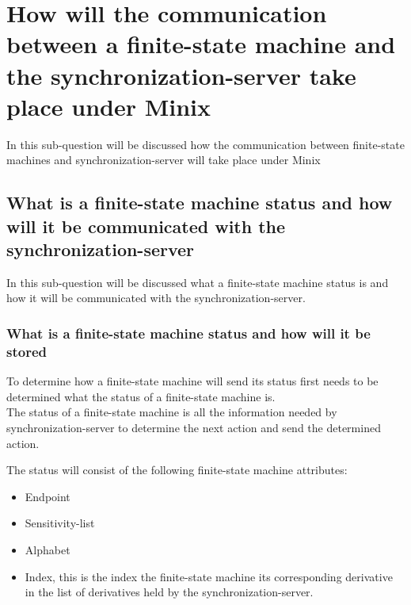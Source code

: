 \hypertarget{how-will-the-communication-between-a-finite-state-machine-and-the-synchronization-server-take-place-under-minix}{%
\section{How will the communication between a finite-state machine and
the synchronization-server take place under
Minix}\label{how-will-the-communication-between-a-finite-state-machine-and-the-synchronization-server-take-place-under-minix}}

In this sub-question will be discussed how the communication between
finite-state machines and synchronization-server will take place under
Minix

\hypertarget{what-is-a-finite-state-machine-status-and-how-will-it-be-communicated-with-the-synchronization-server}{%
\subsection{What is a finite-state machine status and how will it be
communicated with the
synchronization-server}\label{what-is-a-finite-state-machine-status-and-how-will-it-be-communicated-with-the-synchronization-server}}

In this sub-question will be discussed what a finite-state machine
status is and how it will be communicated with the
synchronization-server.

\hypertarget{what-is-a-finite-state-machine-status-and-how-will-it-be-stored}{%
\subsubsection{What is a finite-state machine status and how will it be
stored}\label{what-is-a-finite-state-machine-status-and-how-will-it-be-stored}}

To determine how a finite-state machine will send its status first needs
to be determined what the status of a finite-state machine is.\\
The status of a finite-state machine is all the information needed by
synchronization-server to determine the next action and send the
determined action.

The status will consist of the following finite-state machine
attributes:

\begin{itemize}
\tightlist
\item
  Endpoint
\item
  Sensitivity-list
\item
  Alphabet
\item
  Index, this is the index the finite-state machine its corresponding
  derivative in the list of derivatives held by the
  synchronization-server.
\end{itemize}

